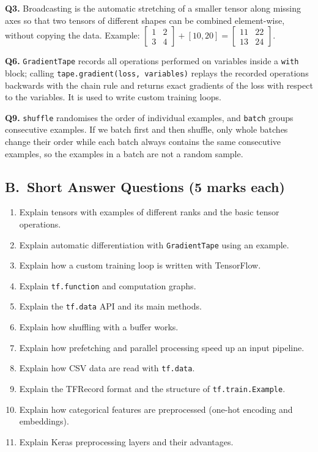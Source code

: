 \begin{modelans}[: Q3, Q6 and Q9]
\textbf{Q3.} Broadcasting is the automatic stretching of a smaller tensor along missing axes so that two tensors of different shapes can be combined element-wise, without copying the data. Example: $\left[\begin{smallmatrix}1&2\\3&4\end{smallmatrix}\right]+[10,20]=\left[\begin{smallmatrix}11&22\\13&24\end{smallmatrix}\right]$.\par
\textbf{Q6.} \texttt{GradientTape} records all operations performed on variables inside a \texttt{with} block; calling \texttt{tape.gradient(loss, variables)} replays the recorded operations backwards with the chain rule and returns exact gradients of the loss with respect to the variables. It is used to write custom training loops.\par
\textbf{Q9.} \texttt{shuffle} randomises the order of individual examples, and \texttt{batch} groups consecutive examples. If we batch first and then shuffle, only whole batches change their order while each batch always contains the same consecutive examples, so the examples in a batch are not a random sample.
\end{modelans}

\subsection*{B.\ Short Answer Questions (5 marks each)}
\begin{enumerate}
  \item Explain tensors with examples of different ranks and the basic tensor operations. 
  \item Explain automatic differentiation with \texttt{GradientTape} using an example. 
  \item Explain how a custom training loop is written with TensorFlow. 
  \item Explain \texttt{tf.function} and computation graphs. 
  \item Explain the \texttt{tf.data} API and its main methods. 
  \item Explain how shuffling with a buffer works. 
  \item Explain how prefetching and parallel processing speed up an input pipeline. 
  \item Explain how CSV data are read with \texttt{tf.data}. 
  \item Explain the TFRecord format and the structure of \texttt{tf.train.Example}. 
  \item Explain how categorical features are preprocessed (one-hot encoding and embeddings). 
  \item Explain Keras preprocessing layers and their advantages. 
\end{enumerate}

